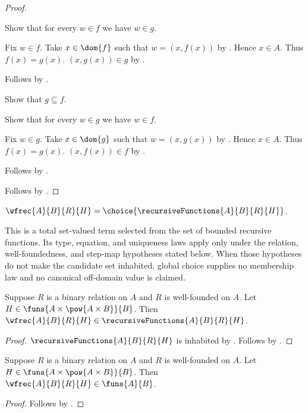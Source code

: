 \begin{proof}
\begin{subproof}
        Show that for every $w\in f$ we have $w\in g$.
        \begin{subproof}
            Fix $w\in f$.
            Take $x\in\dom{f}$ such that $w=(x,f(x))$
                by .
            Hence $x\in A$.
            Thus $f(x)=g(x)$.
            $(x,g(x))\in g$ by .
        \end{subproof}
        Follows by .
    \end{subproof}
    Show that $g\subseteq f$.
    \begin{subproof}
        Show that for every $w\in g$ we have $w\in f$.
        \begin{subproof}
            Fix $w\in g$.
            Take $x\in\dom{g}$ such that $w=(x,g(x))$
                by .
            Hence $x\in A$.
            Thus $f(x)=g(x)$.
            $(x,f(x))\in f$ by .
        \end{subproof}
        Follows by .
    \end{subproof}
    Follows by .
\end{proof}

\begin{definition}\label{wfrec}
    $\wfrec{A}{B}{R}{H}=\choice{\recursiveFunctions{A}{B}{R}{H}}$.
\end{definition}

This is a total set-valued term selected from the set of bounded recursive
functions.  Its type, equation, and uniqueness laws apply only under the
relation, well-foundedness, and step-map hypotheses stated below.  When those
hypotheses do not make the candidate set inhabited, global choice supplies no
membership law and no canonical off-domain value is claimed.

\begin{theorem}\label{wfrec_is_recursive}
    Suppose $R$ is a binary relation on $A$ and $R$ is well-founded on $A$.
    Let $H\in\funs{A\times\pow{A\times B}}{B}$.
    Then $\wfrec{A}{B}{R}{H}\in\recursiveFunctions{A}{B}{R}{H}$.
\end{theorem}
\begin{proof}
    $\recursiveFunctions{A}{B}{R}{H}$ is inhabited
        by .
    Follows by .
\end{proof}

\begin{theorem}\label{wfrec_type}
    Suppose $R$ is a binary relation on $A$ and $R$ is well-founded on $A$.
    Let $H\in\funs{A\times\pow{A\times B}}{B}$.
    Then $\wfrec{A}{B}{R}{H}\in\funs{A}{B}$.
\end{theorem}
\begin{proof}
    Follows by .
\end{proof}

